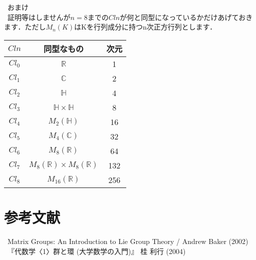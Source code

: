 \documentclass{jreport}
\theoremstyle{idefinition}
\begin{document}
\ おまけ\\
\ 証明等はしませんが$n=8$までの$Cln$が何と同型になっているかだけあげておきます．ただし$M_n(K)$はKを行列成分に持つn次正方行列とします．\\
\begin{center}
\begin{tabular}{|c|c|c|}\hline
$Cln$ & 同型なもの & 次元 \\\hline
$Cl_0$ & $\mathbb{R}$ & 1 \\\hline
$Cl_1$ & $\mathbb{C}$ & 2 \\\hline
$Cl_2$ & $\mathbb{H}$ & 4 \\\hline
$Cl_3$ & $\mathbb{H}\times \mathbb{H}$ & 8 \\\hline
$Cl_4$ & $M_2(\mathbb{H})$ & 16 \\\hline
$Cl_5$ & $M_4(\mathbb{C})$ & 32 \\\hline
$Cl_6$ & $M_8(\mathbb{R})$ & 64 \\\hline
$Cl_7$ & $M_8(\mathbb{R}) \times M_8(\mathbb{R})$ & 132 \\\hline
$Cl_8$ & $M_16(\mathbb{R})$ & 256 \\\hline
\end{tabular}
\end{center}


\section{参考文献}
\ Matrix Groups: An Introduction to Lie Group Theory / Andrew Baker (2002) \\
\ 『代数学〈1〉群と環 (大学数学の入門)』  桂 利行 (2004)
\end{document}

